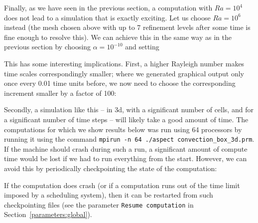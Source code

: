 \documentclass{article}
\begin{document}
Finally, as we have seen in the previous section, a computation with $Ra=10^4$
does not lead to a simulation that is exactly exciting. Let us choose $Ra=10^6$
instead (the mesh chosen above with up to 7 refinement levels after some time
is fine enough to resolve this). We can achieve this in the same way as in the
previous section by choosing $\alpha=10^{-10}$ and setting

This has some interesting implications. First, a higher Rayleigh number makes
time scales correspondingly smaller; where we generated graphical output only
once every 0.01 time units before, we now need to choose the corresponding
increment smaller by a factor of 100:

Secondly, a simulation like this -- in 3d, with a significant number of cells,
and for a significant number of time steps -- will likely take a good amount of
time. The computations for which we show results below was run using 64
processors by running it using the command
{\tt{mpirun -n 64 ./aspect convection\_box\_3d.prm}}. If the machine should crash
during such a run, a significant amount of compute time would be lost if we had
to run everything from the start. However, we can avoid this by periodically
checkpointing the state of the computation:

If the computation does crash (or if a computation runs out of the time limit
imposed by a scheduling system), then it can be restarted from such
checkpointing files (see the parameter {\tt Resume computation}
in Section~\ref{parameters:global}).
\end{document}
